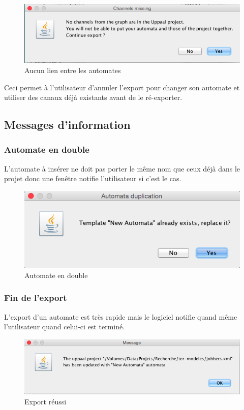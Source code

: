 \documentclass[12pt,a4paper]{report}
\begin{document}
\begin{figure}[h]
  \centering
  \includegraphics[scale=0.6]{ressources/gui/missing.png}
  \caption{Aucun lien entre les automates}
\end{figure}

Ceci permet à l'utilisateur d'annuler l'export pour changer son automate et utiliser 
des canaux déjà existants avant de le ré-exporter.

\subsection{Messages d'information}
\subsubsection*{Automate en double}
L'automate à insérer ne doit pas porter le même nom que ceux déjà dans le projet donc
une fenêtre notifie l'utilisateur si c'est le cas.

\begin{figure}[h]
  \centering
  \includegraphics[scale=0.6]{ressources/gui/exists.png}
  \caption{Automate en double}
\end{figure}

\subsubsection*{Fin de l'export}
L'export d'un automate est très rapide mais le logiciel notifie quand même 
l'utilisateur quand celui-ci est terminé. 

\begin{figure}[h]
  \centering
  \includegraphics[scale=0.6]{ressources/gui/success.png}
  \caption{Export réussi}
\end{figure}
\end{document}
